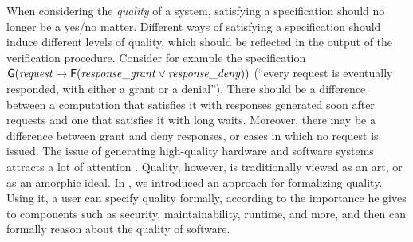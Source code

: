\documentclass{llncs}
\newcommand{\Ev}{\mathsf{F}}
\newcommand{\Alw}{\mathsf{G}}
\begin{document}
When considering the \emph{quality} of a system,
satisfying a specification should no longer be a yes/no matter. Different ways of satisfying a specification should induce different levels of quality, which should be reflected in the output of the verification procedure. Consider for example the specification
$\Alw({\it  request} \rightarrow \Ev({\it response\_grant} \vee {\it response\_deny}))$ (``every request is eventually responded, with either a grant or a denial''). There should be a difference between a computation that satisfies it with responses generated soon after requests and one that satisfies it with long waits. Moreover, there may be a difference between grant and deny responses, or cases in which no request is issued.
The issue of generating high-quality hardware and software systems attracts a lot of attention \cite{Kan02,Spi06}. Quality, however, is traditionally viewed as an art, or as an amorphic ideal.  
In \cite{ABK13}, we introduced an approach for formalizing quality. Using it, a user can specify quality formally, according to the importance he gives to components such as security, maintainability, runtime, and more, and then can formally reason about the quality of software.
\end{document}
